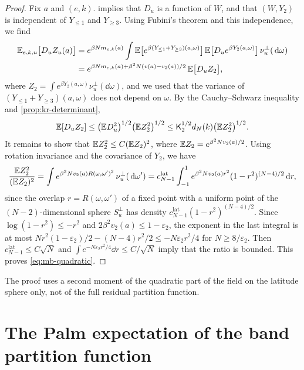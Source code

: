 \begin{proof}
Fix $a$ and $(e,k)$.  implies that $D_u$ is a function of $W$, and that $(W,Y_2)$ is independent of $Y_{\le1}$ and $Y_{\ge3}$. Using Fubini's theorem and this independence, we find
\[
\begin{aligned}
\mathbb E_{e,k,u}\bigl[D_uZ_u(a)\bigr]&=e^{\beta Nm_{e,k}(a)}\int\mathbb E\bigl[e^{\beta(Y_{\le1}+Y_{\ge3})(a,\omega)}\bigr]\,\mathbb E\bigl[D_ue^{\beta Y_2(a,\omega)}\bigr]\,\nu_u^\perp(\,\mathrm d\omega)\\
&=e^{\beta Nm_{e,k}(a)+\beta^2N(v(a)-v_2(a))/2}\,\mathbb E\bigl[D_uZ_{2}\bigr],
\end{aligned}
\]
where $Z_2=\int e^{\beta Y_2(a,\omega)}\nu_u^\perp(\dd\omega)$, and we used that the variance of $(Y_{\le1}+Y_{\ge3})(a,\omega)$ does not depend on $\omega$. By the Cauchy--Schwarz inequality and \cref{prop:kr-determinant},
\[
\mathbb E[D_uZ_2]\le\bigl(\mathbb E D_u^2\bigr)^{1/2}\bigl(\mathbb E Z_2^2\bigr)^{1/2}\le\mathsf K_2^{1/2}d_N(k)\bigl(\mathbb E Z_2^2\bigr)^{1/2}.
\]
It remains to show that $\mathbb E Z_2^2\le C(\mathbb E Z_2)^2$, where $\mathbb E Z_2=e^{\beta^2Nv_2(a)/2}$. Using rotation invariance and the covariance of $Y_2$, we have
\[
\frac{\mathbb E Z_2^2}{(\mathbb E Z_2)^2}=\int e^{\beta^2Nv_2(a)R(\omega,\omega')^2}\,\nu_u^\perp(\,\mathrm d\omega')=c_{N-1}^{\mathrm{lat}}\int_{-1}^1e^{\beta^2Nv_2(a)r^2}(1-r^2)^{(N-4)/2}\,\mathrm d r,
\]
since the overlap $r=R(\omega,\omega')$ of a fixed point with a uniform point of the $(N-2)$-dimensional sphere $S_u^\perp$ has density $c_{N-1}^{\mathrm{lat}}(1-r^2)^{(N-4)/2}$. Since $\log(1-r^2)\le-r^2$ and $2\beta^2v_2(a)\le1-\varepsilon_2$, the exponent in the last integral is at most $Nr^2(1-\varepsilon_2)/2-(N-4)r^2/2\le-N\varepsilon_2r^2/4$ for $N\ge8/\varepsilon_2$. Then $c_{N-1}^{\mathrm{lat}}\le C\sqrt N$ and $\int e^{-N\varepsilon_2r^2/4}\dd r\le C/\sqrt N$ imply that the ratio is bounded. This proves \eqref{eq:mb-quadratic}.
\end{proof}

The proof uses a second moment of the quadratic part of the field on the latitude sphere only, not of the full residual partition function.

\section{The Palm expectation of the band partition function}\label{sec:mb-upper}

